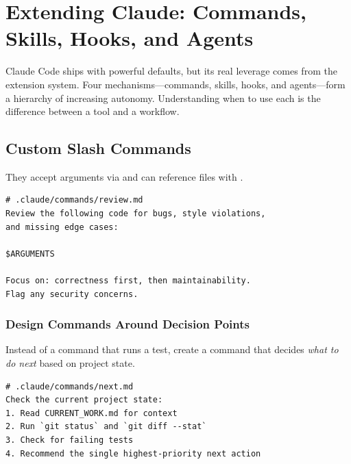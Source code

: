 \chapter{Extending Claude: Commands, Skills, Hooks, and Agents}
\label{ch:extensions}

Claude Code ships with powerful defaults, but its real leverage comes from
the extension system. Four mechanisms---commands, skills, hooks, and agents---form
a hierarchy of increasing autonomy. Understanding when to use each is the difference
between a tool and a workflow.

\section{Custom Slash Commands}
\label{sec:commands}


They accept arguments via  and can reference files with .

\begin{verbatim}
# .claude/commands/review.md
Review the following code for bugs, style violations,
and missing edge cases:

$ARGUMENTS

Focus on: correctness first, then maintainability.
Flag any security concerns.
\end{verbatim}

\subsection{Design Commands Around Decision Points}

Instead of a command that runs a test, create a command that decides
\emph{what to do next} based on project state.

\begin{verbatim}
# .claude/commands/next.md
Check the current project state:
1. Read CURRENT_WORK.md for context
2. Run `git status` and `git diff --stat`
3. Check for failing tests
4. Recommend the single highest-priority next action
\end{verbatim}

